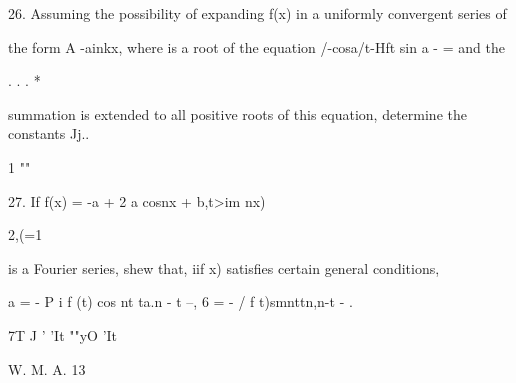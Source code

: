 26. Assuming the possibility of expanding f(x) in a uniformly
convergent series of

the form A -ainkx, where is a root of the equation /-cosa/t-Hft sin a
- = and the

  . . . *

summation is extended to all positive roots of this equation,
determine the constants Jj..


1 ""

27. If f(x) = -a + 2 a cosnx + b,t>im nx)

2,(=1

is a Fourier series, shew that, iif x) satisfies certain general
conditions,

a = - P i f (t) cos nt ta.n - t --, 6 = - / f t)smnttn,n-t - .

7T J ' 'It ""yO 'It


W. M. A. 13
